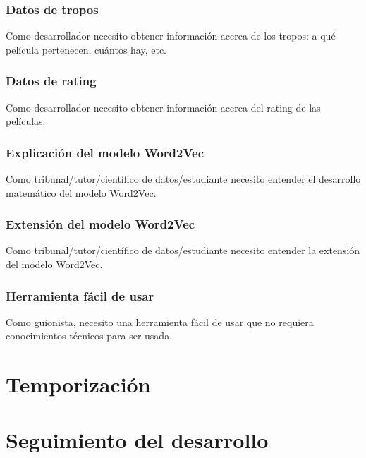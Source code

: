 \subsubsection*{Datos de tropos}\label{uc:trope_data}

Como desarrollador necesito obtener información acerca de los
tropos: a qué película pertenecen, cuántos hay, etc.

\subsubsection*{Datos de rating}\label{uc:rating_data}

Como desarrollador necesito obtener información acerca del rating
de las películas.

\subsubsection*{Explicación del modelo Word2Vec}\label{uc:math}

Como tribunal/tutor/científico de datos/estudiante
necesito entender el desarrollo matemático del modelo Word2Vec.

\subsubsection*{Extensión del modelo Word2Vec}\label{uc:math_extension}

Como tribunal/tutor/científico de datos/estudiante
necesito entender la extensión del modelo Word2Vec.

\subsubsection*{Herramienta fácil de usar}\label{uc:user_friendly_tool}

Como guionista, necesito una herramienta
fácil de usar que no requiera conocimientos técnicos para ser usada.

\section{Temporización}

\section{Seguimiento del desarrollo}
